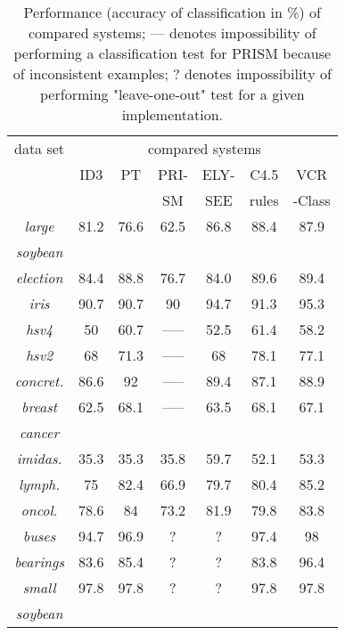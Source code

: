 \begin{table}
\begin{center}
{\footnotesize
\caption{Performance (accuracy of classification in \%)
of compared systems; --- denotes impossibility of
performing a classification test for PRISM because of inconsistent
examples; ? denotes impossibility of performing "leave-one-out" test
for a given implementation.}
\vspace{5pt}
\begin{tabular}{|c|c|c|c|c|c|c|} \hline
data set & \multicolumn{6}{|c|}{compared systems}  \\ \cline{2-7}
 & ID3 & PT & PRI- & ELY- & C4.5 & VCR \\
 &    &     &  SM & SEE  &  rules &  -Class \\\hline
{\it large} & 81.2 & 76.6 & 62.5 & 86.8 & 88.4 & 87.9 \\
{\it soybean} &       &      &      &      &      &      \\ \hline
{\it election} & 84.4 & 88.8 & 76.7 & 84.0 & 89.6 & 89.4 \\ \hline
{\it iris} & 90.7 & 90.7 & 90 & 94.7 & 91.3 & 95.3 \\ \hline
{\it hsv4} & 50 & 60.7 & ----- & 52.5 & 61.4 & 58.2 \\ \hline
{\it hsv2} & 68 & 71.3 & ----- & 68 & 78.1 & 77.1 \\ \hline
{\it concret.} & 86.6 & 92 & ----- & 89.4 & 87.1 & 88.9 \\ \hline
{\it breast} & 62.5 & 68.1 & ----- & 63.5 & 68.1 & 67.1\\
{\it cancer} &      &      &      &      &      &      \\ \hline
{\it imidas.} & 35.3 & 35.3 & 35.8 & 59.7 & 52.1 & 53.3 \\ \hline
{\it lymph.} & 75 & 82.4 & 66.9 & 79.7 & 80.4 & 85.2 \\ \hline
{\it oncol.} & 78.6 & 84 & 73.2 & 81.9 & 79.8 & 83.8 \\ \hline
{\it buses} & 94.7 & 96.9 & ? & ? &  97.4 & 98 \\ \hline
{\it bearings} & 83.6 & 85.4 & ? & ? & 83.8 & 96.4 \\ \hline
{\it small} & 97.8 & 97.8 & ? & ? & 97.8 & 97.8 \\
{\it soybean} &       &      &      &      &      &      \\ \hline
\end{tabular}
}
\end{center}
\end{table}

